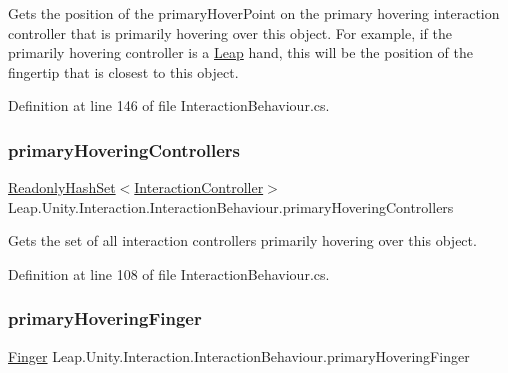 Gets the position of the primary\+Hover\+Point on the primary hovering interaction controller that is primarily hovering over this object. For example, if the primarily hovering controller is a \mbox{\hyperlink{namespace_leap_1_1_unity_1_1_leap}{Leap}} hand, this will be the position of the fingertip that is closest to this object. 



Definition at line 146 of file Interaction\+Behaviour.\+cs.

\mbox{\label{class_leap_1_1_unity_1_1_interaction_1_1_interaction_behaviour_a9e3910dd8d02adadb5c2a85401052f42}} 
\subsubsection{\texorpdfstring{primaryHoveringControllers}{primaryHoveringControllers}}
{\footnotesize\ttfamily \mbox{\hyperlink{struct_leap_1_1_unity_1_1_readonly_hash_set}{Readonly\+Hash\+Set}}$<$\mbox{\hyperlink{class_leap_1_1_unity_1_1_interaction_1_1_interaction_controller}{Interaction\+Controller}}$>$ Leap.\+Unity.\+Interaction.\+Interaction\+Behaviour.\+primary\+Hovering\+Controllers\hspace{0.3cm}{\ttfamily [get]}}



Gets the set of all interaction controllers primarily hovering over this object. 



Definition at line 108 of file Interaction\+Behaviour.\+cs.

\mbox{\label{class_leap_1_1_unity_1_1_interaction_1_1_interaction_behaviour_a7810b944120ba2c2207071ca660967b2}} 
\subsubsection{\texorpdfstring{primaryHoveringFinger}{primaryHoveringFinger}}
{\footnotesize\ttfamily \mbox{\hyperlink{class_leap_1_1_finger}{Finger}} Leap.\+Unity.\+Interaction.\+Interaction\+Behaviour.\+primary\+Hovering\+Finger\hspace{0.3cm}{\ttfamily [get]}}



